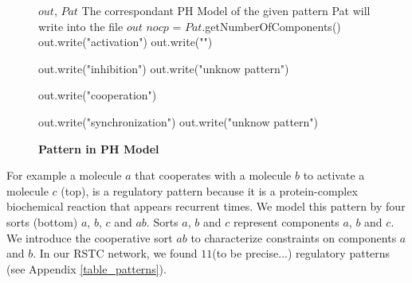
\begin{figure}[!t]
\begin{algorithmic}[1]
\REQUIRE $out$, $Pat$ 
\ENSURE The correspondant PH Model of the given pattern Pat will write into the file $out$
\STATE $nocp$ = $Pat$.getNumberOfComponents() 
\STATE 
{}
   \STATE out.write("activation")
   \STATE out.write("")
        
\ENDCASE
{}
  \STATE out.write("inhibition")
  \STATE 
\DEFAULT
 \STATE out.write("unknow pattern")
 \ENDDEFAULT
\ENDSWITCH
   
   
\ENDCASE

   \STATE out.write("cooperation")
        
\ENDCASE
{}
  \STATE out.write("synchronization")
\DEFAULT
 \STATE out.write("unknow pattern")
 \ENDDEFAULT
\ENDSWITCH
   
   
\ENDCASE
\ENDSWITCH
\end{algorithmic}
\caption{\bf Pattern in PH Model}\label{PHModel}
\end{figure}


For example a molecule $a$ that cooperates with a molecule $b$ to activate a molecule $c$  (top), is a regulatory pattern because it is a protein-complex biochemical reaction that appears recurrent times.  
We model this pattern by four sorts  (bottom) $a$, $b$, $c$ and $ab$. Sorts $a$, $b$ and $c$
represent components $a$, $b$ and $c$. We introduce the cooperative sort $ab$ to characterize constraints on components $a$ and $b$.
In our RSTC network, we found $11$(to be precise...) regulatory patterns (see Appendix \ref{table_patterns}). 

